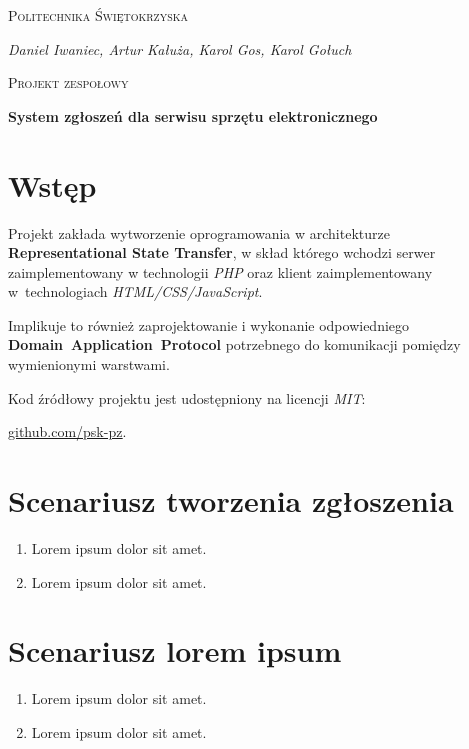 \documentclass[11pt,a4paper]{article}
\begin{document}
\begin{titlepage}
    \centering
    {\scshape\huge Politechnika Świętokrzyska \par}
    \vspace{0.5cm}
    {\Large\itshape Daniel Iwaniec, Artur Kałuża, Karol Gos, Karol Gołuch\par}
    \vspace{2cm}
    {\scshape\LARGE Projekt zespołowy\par}
    \vspace{0.5cm}
    {\bfseries System zgłoszeń dla serwisu sprzętu elektronicznego\par}

    \vfil

    \raggedright
    \section{Wstęp}
    Projekt zakłada wytworzenie oprogramowania w architekturze \textbf{Representational State Transfer}, w skład którego wchodzi serwer zaimplementowany w technologii \textit{PHP} oraz klient zaimplementowany w~technologiach \textit{HTML/CSS/JavaScript}.
    \par \bigskip Implikuje to również zaprojektowanie i wykonanie odpowiedniego \textbf{Domain~Application~Protocol} potrzebnego do komunikacji pomiędzy wymienionymi warstwami.
    \par \bigskip Kod źródłowy projektu jest udostępniony na licencji \textit{MIT}:
    \par \underline{\href{https://github.com/psk-pz}{github.com/psk-pz}}.
\end{titlepage}

\section{Scenariusz tworzenia zgłoszenia}
\begin{enumerate}
\item{Lorem ipsum dolor sit amet.}
\item{Lorem ipsum dolor sit amet.}
\end{enumerate}

\section{Scenariusz lorem ipsum}
\begin{enumerate}
\item{Lorem ipsum dolor sit amet.}
\item{Lorem ipsum dolor sit amet.}
\end{enumerate}
\end{document}

